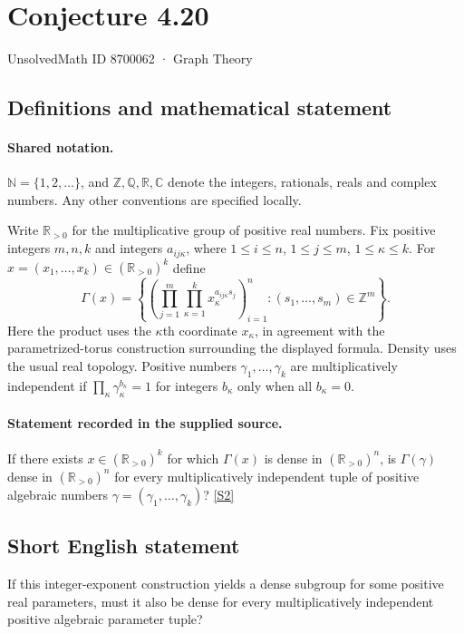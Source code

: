 \documentclass[11pt]{article}
\newcommand{\sref}[2]{\hyperlink{source:#1:#2}{[S#2]}}
\begin{document}
\setcounter{section}{8700061}
\section{Conjecture 4.20}\label{8700062}
{\small\sffamily UnsolvedMath ID 8700062 · Graph Theory}
\subsection{Definitions and mathematical statement}

\paragraph{Shared notation.}$\mathbb N=\{1,2,\ldots\}$, and $\mathbb Z,\mathbb Q,\mathbb R,\mathbb C$ denote the integers, rationals, reals and complex numbers. Any other conventions are specified locally.


Write $\mathbb R_{>0}$ for the multiplicative group of positive real numbers. Fix positive integers $m,n,k$ and integers $a_{ij\kappa}$, where $1\le i\le n$, $1\le j\le m$, $1\le\kappa\le k$. For $x=(x_1,\ldots,x_k)\in(\mathbb R_{>0})^k$ define
\[
\Gamma(x)=\left\{\left(\prod_{j=1}^m\prod_{\kappa=1}^k x_\kappa^{a_{ij\kappa}s_j}\right)_{i=1}^n:(s_1,\ldots,s_m)\in\mathbb Z^m\right\}.
\]
Here the product uses the $\kappa$th coordinate $x_\kappa$, in agreement with the parametrized-torus construction surrounding the displayed formula. Density uses the usual real topology. Positive numbers $\gamma_1,\ldots,\gamma_k$ are multiplicatively independent if $\prod_\kappa\gamma_\kappa^{b_\kappa}=1$ for integers $b_\kappa$ only when all $b_\kappa=0$.
\paragraph{Statement recorded in the supplied source.}
If there exists $x\in(\mathbb R_{>0})^k$ for which $\Gamma(x)$ is dense in $(\mathbb R_{>0})^n$, is $\Gamma(\gamma)$ dense in $(\mathbb R_{>0})^n$ for every multiplicatively independent tuple of positive algebraic numbers $\gamma=(\gamma_1,\ldots,\gamma_k)$? \sref{8700062}{2}

\subsection{Short English statement}
If this integer-exponent construction yields a dense subgroup for some positive real parameters, must it also be dense for every multiplicatively independent positive algebraic parameter tuple?
\end{document}
